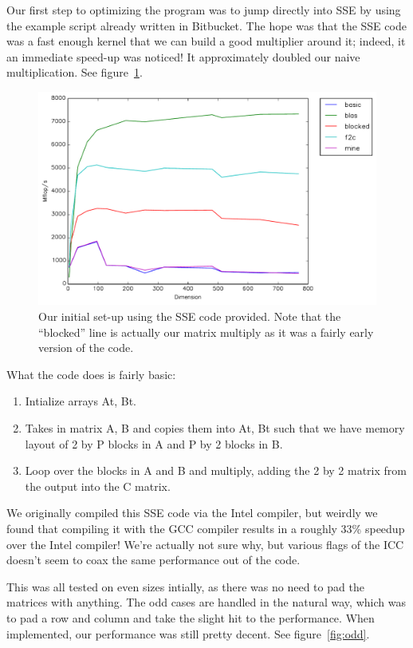 \documentclass{article}
\begin{document}
  Our first step to optimizing the program was to jump directly into SSE by using the example script already written in Bitbucket.
  The hope was that the SSE code was a fast enough kernel that we can build a good multiplier around it; indeed, it an immediate
  speed-up was noticed! It approximately doubled our naive multiplication. See figure~\ref{fig:initial}.

  \begin{figure}[h]
    \centering
    \includegraphics[width=.7\textwidth]{initial.pdf}
    \caption{Our initial set-up using the SSE code provided. Note that the ``blocked'' line is actually our matrix multiply as it was a fairly early version of the code.}
    \label{fig:initial}
  \end{figure}

  What the code does is fairly basic:
  \begin{enumerate}
    \item Intialize arrays At, Bt.
    \item Takes in matrix A, B and copies them into At, Bt such that we have memory layout of 2 by P blocks in A and P by 2 blocks in B.
    \item Loop over the blocks in A and B and multiply, adding the 2 by 2 matrix from the output into the C matrix.
  \end{enumerate}

  We originally compiled this SSE code via the Intel compiler, but weirdly we found that compiling it with the GCC compiler results in a roughly
  33\% speedup over the Intel compiler! We're actually not sure why, but various flags of the ICC doesn't seem to coax the same performance
  out of the code.

  This was all tested on even sizes intially, as there was no need to pad the matrices with anything. The odd cases
  are handled in the natural way, which was to pad a row and column and take the slight hit to the performance.
  When implemented, our performance was still pretty decent. See figure~\ref{fig:odd}.
\end{document}
